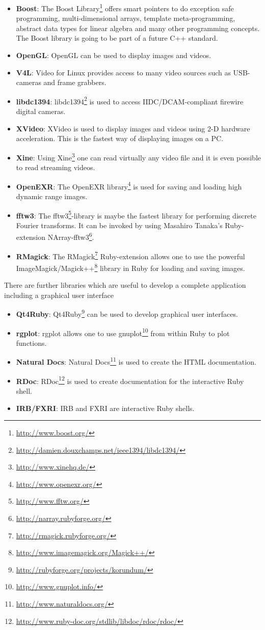 \documentclass[a4paper,12pt]{book}
\begin{document}
\begin{itemize}
\item {\bf Boost}: The Boost Library\footnote{\url{http://www.boost.org/}}
  offers smart pointers to do exception safe programming, multi-dimensional
  arrays, template meta-programming, abstract data types for linear algebra
  and many other programming concepts. The Boost library is going to be part
  of a future C++ standard.
\item {\bf OpenGL}: OpenGL can be used to display images and videos.
\item {\bf V4L}: Video for Linux provides access to many video sources
  such as USB-cameras and frame grabbers.
\item {\bf libdc1394}: libdc1394\footnote{\url{http://damien.douxchamps.net/ieee1394/libdc1394/}}
  is used to access IIDC/DCAM-compliant firewire digital cameras.
\item {\bf XVideo}: XVideo is used to display images and videos using
  2-D hardware acceleration. This is the fastest way of displaying images
  on a PC.
\item {\bf Xine}: Using Xine\footnote{\url{http://www.xinehq.de/}} one can
  read virtually any video file and it is even possible to read streaming
  videos.
\item {\bf OpenEXR}: The OpenEXR library\footnote{\url{http://www.openexr.org/}}
  is used for saving and loading high dynamic range images.
\item {\bf fftw3}: The fftw3\footnote{\url{http://www.fftw.org/}}-library
  is maybe the fastest library for performing discrete Fourier transforms. It
  can be invoked by using Masahiro Tanaka's Ruby-extension
  NArray-fftw3\footnote{\url{http://narray.rubyforge.org/}}.
\item {\bf RMagick}: The RMagick\footnote{\url{http://rmagick.rubyforge.org/}}
  Ruby-extension allows one to use the powerful ImageMagick/Magick++\footnote{\url{http://www.imagemagick.org/Magick++/}}
  library in Ruby for loading and saving images.
\end{itemize}
There are further libraries which are useful to develop a complete application
including a graphical user interface
\begin{itemize}
\item {\bf Qt4Ruby}: Qt4Ruby\footnote{\url{http://rubyforge.org/projects/korundum/}}
  can be used to develop graphical user interfaces.
\item {\bf rgplot}: rgplot allows one to use gnuplot\footnote{\url{http://www.gnuplot.info/}} from within Ruby to plot functions.
\item {\bf Natural Docs}: Natural Docs\footnote{\url{http://www.naturaldocs.org/}}
  is used to create the HTML documentation.
\item {\bf RDoc}: RDoc\footnote{\url{http://www.ruby-doc.org/stdlib/libdoc/rdoc/rdoc/}}
  is used to create documentation for the interactive Ruby shell.
\item {\bf IRB/FXRI}: IRB and FXRI are interactive Ruby shells.
\end{itemize}
\end{document}
